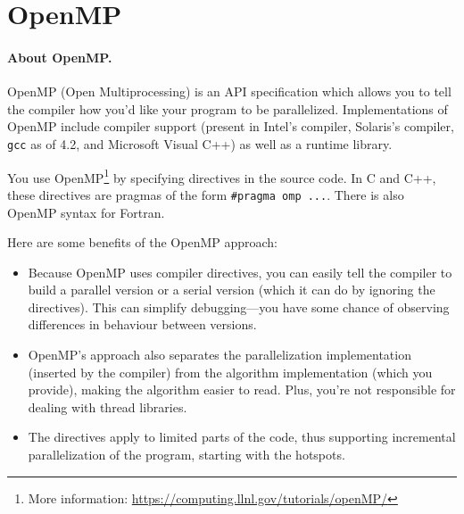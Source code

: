 




\section*{OpenMP}

\paragraph{About OpenMP.} OpenMP (Open Multiprocessing) 
is an API specification which allows you to tell the compiler how you'd 
like your program to be parallelized. Implementations of OpenMP 
include compiler support (present in Intel's compiler, Solaris's 
compiler, {\tt gcc} as of 4.2, and Microsoft Visual C++) as well as a 
runtime library.

You use OpenMP\footnote{More information:
  \url{https://computing.llnl.gov/tutorials/openMP/}} by specifying
directives in the source code. In C and C++, these directives are
pragmas of the form \verb+#pragma omp ...+. There is also OpenMP
syntax for Fortran. 

Here are some benefits of the OpenMP approach:
\begin{itemize}
\item Because OpenMP uses compiler directives, you can easily tell the
  compiler to build a parallel version or a serial version (which it can do by
  ignoring the directives). This can simplify debugging---you
  have some chance of observing differences in behaviour between 
  versions.
\item OpenMP's approach also separates the parallelization
  implementation (inserted by the compiler) from the algorithm
  implementation (which you provide), making the algorithm easier to
  read. Plus, you're not responsible for dealing with thread libraries.
\item The directives apply to limited parts of the code, thus supporting
  incremental parallelization of the program, starting with the hotspots.
\end{itemize}

